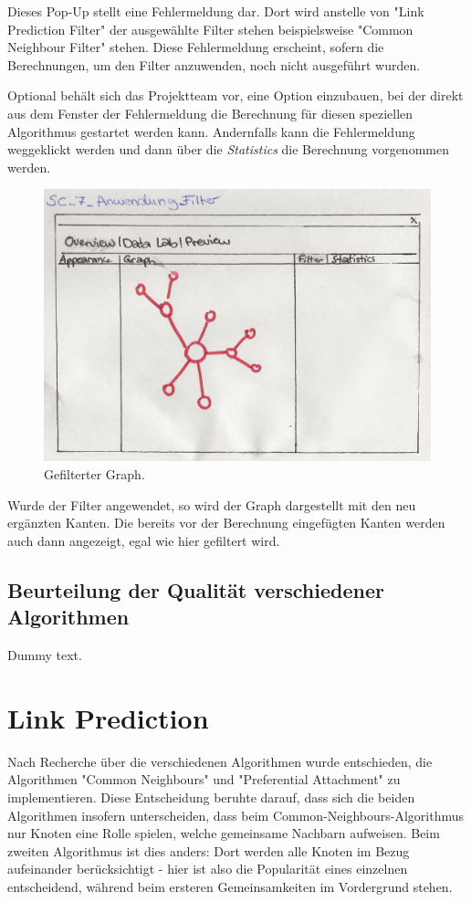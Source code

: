 Dieses Pop-Up stellt eine Fehlermeldung dar. Dort wird anstelle von "Link Prediction Filter" der ausgewählte Filter
stehen beispielsweise "Common Neighbour Filter" stehen. Diese Fehlermeldung erscheint, sofern die Berechnungen, um den
Filter anzuwenden, noch nicht ausgeführt wurden.

Optional behält sich das Projektteam vor, eine Option einzubauen, bei der direkt aus dem Fenster der Fehlermeldung die
Berechnung für diesen speziellen Algorithmus gestartet werden kann. Andernfalls kann die Fehlermeldung weggeklickt
werden und dann über die \textit{Statistics} die Berechnung vorgenommen werden.

\begin{figure}[htbp]
    \includegraphics[width=\linewidth]{resources/SC-7.png}
    \caption{Gefilterter Graph.}
    \label{fig:screen7}
\end{figure}

Wurde der Filter angewendet, so wird der Graph dargestellt mit den neu ergänzten Kanten. Die bereits vor der Berechnung
eingefügten Kanten werden auch dann angezeigt, egal wie hier gefiltert wird.

\subsection{Beurteilung der Qualität verschiedener Algorithmen}

Dummy text.

\section{Link Prediction}
Nach Recherche über die verschiedenen Algorithmen wurde entschieden, die Algorithmen "Common Neighbours" und
"Preferential Attachment" zu implementieren. Diese Entscheidung beruhte darauf, dass sich die beiden Algorithmen
insofern unterscheiden, dass beim Common-Neighbours-Algorithmus nur Knoten eine Rolle spielen, welche gemeinsame
Nachbarn aufweisen. Beim zweiten Algorithmus ist dies anders: Dort werden alle Knoten im Bezug aufeinander
berücksichtigt - hier ist also die Popularität eines einzelnen entscheidend, während beim ersteren Gemeinsamkeiten im
Vordergrund stehen.

